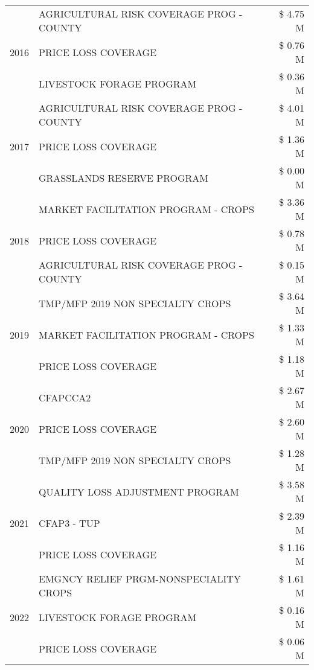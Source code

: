 \begin{tabular}{llr}
\cline{1-3}
\multirow[t]{3}{*}{2016} & AGRICULTURAL RISK COVERAGE PROG - COUNTY & \$ 4.75 M \\
 & PRICE LOSS COVERAGE & \$ 0.76 M \\
 & LIVESTOCK FORAGE PROGRAM & \$ 0.36 M \\
\cline{1-3}
\multirow[t]{3}{*}{2017} & AGRICULTURAL RISK COVERAGE PROG - COUNTY & \$ 4.01 M \\
 & PRICE LOSS COVERAGE & \$ 1.36 M \\
 & GRASSLANDS RESERVE PROGRAM & \$ 0.00 M \\
\cline{1-3}
\multirow[t]{3}{*}{2018} & MARKET FACILITATION PROGRAM - CROPS & \$ 3.36 M \\
 & PRICE LOSS COVERAGE & \$ 0.78 M \\
 & AGRICULTURAL RISK COVERAGE PROG - COUNTY & \$ 0.15 M \\
\cline{1-3}
\multirow[t]{3}{*}{2019} & TMP/MFP 2019 NON SPECIALTY CROPS & \$ 3.64 M \\
 & MARKET FACILITATION PROGRAM - CROPS & \$ 1.33 M \\
 & PRICE LOSS COVERAGE & \$ 1.18 M \\
\cline{1-3}
\multirow[t]{3}{*}{2020} & CFAPCCA2 & \$ 2.67 M \\
 & PRICE LOSS COVERAGE & \$ 2.60 M \\
 & TMP/MFP 2019 NON SPECIALTY CROPS & \$ 1.28 M \\
\cline{1-3}
\multirow[t]{3}{*}{2021} & QUALITY LOSS ADJUSTMENT PROGRAM & \$ 3.58 M \\
 & CFAP3 - TUP & \$ 2.39 M \\
 & PRICE LOSS COVERAGE & \$ 1.16 M \\
\cline{1-3}
\multirow[t]{3}{*}{2022} & EMGNCY RELIEF PRGM-NONSPECIALITY CROPS & \$ 1.61 M \\
 & LIVESTOCK FORAGE PROGRAM & \$ 0.16 M \\
 & PRICE LOSS COVERAGE & \$ 0.06 M \\
\cline{1-3}
\bottomrule
\end{tabular}
